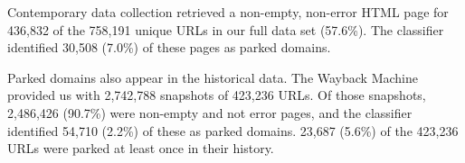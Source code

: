 Contemporary data collection retrieved a non-empty, non-error HTML
page for 436,832 of the 758,191 unique URLs in our full data set
(57.6\%).  The classifier identified 30,508 (7.0\%) of these pages as
parked domains.

Parked domains also appear in the historical data.  The Wayback
Machine provided us with 2,742,788 snapshots of 423,236 URLs.  Of
those snapshots, 2,486,426 (90.7\%) were non-empty and not error
pages, and the classifier identified 54,710 (2.2\%) of these as parked
domains.  23,687 (5.6\%) of the 423,236 URLs were parked at least once
in their history.
